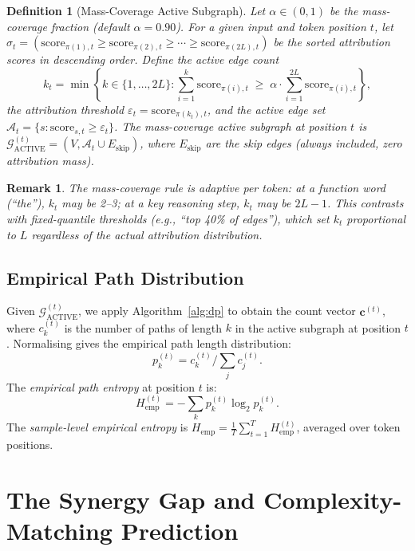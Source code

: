 \documentclass{article}
\newtheorem{definition}{Definition}
\newtheorem{remark}{Remark}
\newcommand{\Gcal}{\mathcal{G}}
\newcommand{\Acal}{\mathcal{A}}
\newcommand{\Hemp}{H_{\mathrm{emp}}}
\newcommand{\score}{\mathrm{score}}
\newcommand{\ACTIVE}{\mathrm{ACTIVE}}
\begin{document}
\begin{definition}[Mass-Coverage Active Subgraph]
\label{def:active}
Let $\alpha \in (0,1)$ be the \emph{mass-coverage fraction} (default $\alpha=0.90$).
For a given input and token position $t$, let
$\sigma_t = (\score_{\pi(1),t} \geq \score_{\pi(2),t} \geq \cdots \geq \score_{\pi(2L),t})$
be the sorted attribution scores in descending order.
Define the \emph{active edge count}
\[
  k_t = \min\left\{ k \in \{1,\ldots,2L\} :
  \sum_{i=1}^{k} \score_{\pi(i),t} \;\geq\; \alpha \cdot \sum_{i=1}^{2L} \score_{\pi(i),t}
  \right\},
\]
the \emph{attribution threshold} $\varepsilon_t = \score_{\pi(k_t),t}$,
and the \emph{active edge set}
$\Acal_t = \{ s : \score_{s,t} \geq \varepsilon_t \}$.
The \emph{mass-coverage active subgraph at position $t$} is
$\Gcal_\ACTIVE^{(t)} = (V, \Acal_t \cup E_{\mathrm{skip}})$,
where $E_{\mathrm{skip}}$ are the skip edges (always included, zero attribution mass).
\end{definition}

\begin{remark}
The mass-coverage rule is \emph{adaptive per token}: at a function word (``the''),
$k_t$ may be 2--3; at a key reasoning step, $k_t$ may be $2L-1$.  This contrasts
with fixed-quantile thresholds (e.g., ``top 40\% of edges''), which set $k_t$
proportional to $L$ regardless of the actual attribution distribution.
\end{remark}

\subsection{Empirical Path Distribution}
\label{sec:empirical}

Given $\Gcal_\ACTIVE^{(t)}$, we apply Algorithm~\ref{alg:dp} to obtain the
count vector $\mathbf{c}^{(t)}$, where $c^{(t)}_k$ is the number of paths of
length $k$ in the active subgraph at position $t$.
Normalising gives the empirical path length distribution:
\[
  p^{(t)}_k = c^{(t)}_k \Big/ \sum_{j} c^{(t)}_j.
\]
The \emph{empirical path entropy} at position $t$ is:
\begin{equation}
  \Hemp^{(t)} = -\sum_{k} p^{(t)}_k \log_2 p^{(t)}_k.
  \label{eq:hemp}
\end{equation}
The \emph{sample-level empirical entropy} is
$\Hemp = \frac{1}{T}\sum_{t=1}^{T} \Hemp^{(t)}$,
averaged over token positions.

\section{The Synergy Gap and Complexity-Matching Prediction}
\label{sec:synergy}
\end{document}
